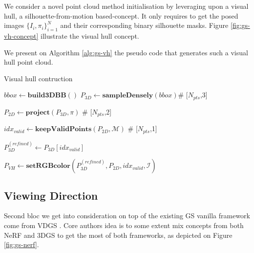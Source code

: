 We consider a novel point cloud method initialisation by leveraging upon a visual hull, a silhouette-from-motion \citep{baumgart1974geometric} based-concept. It only requires to get the posed images $\{I_{i},\pi_{i}\}_{i=1}^{N}$ and their corresponding binary silhouette masks. Figure \ref{fig:gs-vh-concept} illustrate the visual hull concept. 

We present on Algorithm \ref{alg:gs-vh} the pseudo code that generates such a visual hull point cloud. 

\begin{algorithm}[htpb!]
  \caption{Visual hull contruction}\label{alg:gs-vh}
  \medskip
  \medskip
  $bbox \gets \mathbf{build3DBB}()$ 
  $P_{3D} \gets \mathbf{sampleDensely}(bbox)$\hspace{.4cm}\textcolor{gray!80}{\# 
    [$N_{pts}$,3]} 

   $P_{2D} \gets \mathbf{project}(P_{3D},\pi)$ \hspace{.4cm}\textcolor{gray!80}{\# 
    [$N_{pts}$,2]} 
    
    $idx_{valid} \gets \mathbf{keepValidPoints}(P_{2D},\mathcal{M})$ \hspace{.4cm}\textcolor{gray!80}{\# 
    [$N_{pts}$,1]} 

    $P_{3D}^{(refined)} \gets P_{3D}[idx_{valid}]$ 

    $P_{VH} \gets \mathbf{setRGBcolor}(P_{3D}^{(refined)},P_{2D},idx_{valid},\mathcal{I})$ 
\end{algorithm}


\subsection{Viewing Direction}
Second bloc we get into consideration on top of the existing GS vanilla framework come from \ac{VDGS} \citep{malarz2023gaussian}. Core authors idea is to some extent mix concepts from both \ac{NeRF} and 3D\ac{GS} to get the most of both frameworks, as depicted on Figure \ref{fig:gs-nerf}. 


